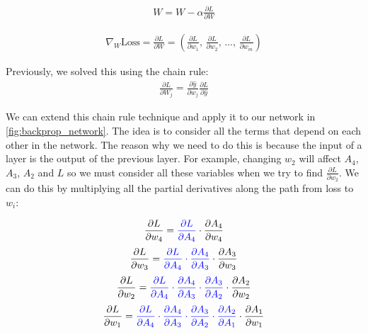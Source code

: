 \documentclass[11pt]{article}
\numberwithin{equation}{section}
\theoremstyle{definition}%
\newcommand{\Loss}{L}
\begin{document}
\begin{align}
    W = W - \alpha \frac{\partial \Loss}{\partial W}
\end{align}

\begin{align}
    \nabla_W \text{Loss} = \frac{\partial \Loss}{\partial W} = \left( \frac{\partial \Loss}{\partial w_1},\, \frac{\partial \Loss}{\partial w_2},\, \ldots,\, \frac{\partial \Loss}{\partial w_m} \right)
\end{align}

Previously, we solved this using the chain rule:
\begin{align}
    \frac{\partial L}{\partial W_j} = \frac{\partial \hat{y}}{\partial w_j} \frac{\partial L}{\partial \hat{y}}
\end{align}

We can extend this chain rule technique and apply it to our network in \autoref{fig:backprop_network}. The idea is to consider all the terms that depend on each other in the network. The reason why we need to do this is because the input of a layer is the output of the previous layer. For example, changing $w_2$ will affect $A_4$, $A_3$, $A_2$ and $L$ so we must consider all these variables when we try to find $\frac{\partial L}{\partial w_2}$. We can do this by multiplying all the partial derivatives along the path from loss to $w_i$:

\begin{align}
    \frac{\partial L}{\partial w_4} = \color{blue} \frac{\partial L}{\partial A_4} \color{black} \cdot \frac{\partial A_4}{\partial w_4}
\end{align}
\begin{align}
    \frac{\partial L}{\partial w_3} = \color{blue} \frac{\partial L}{\partial A_4} \cdot \frac{\partial A_4}{\partial A_3} \color{black} \cdot \frac{\partial A_3}{\partial w_3}
\end{align}
\begin{align}
    \frac{\partial L}{\partial w_2} = \color{blue} \frac{\partial L}{\partial A_4} \cdot \frac{\partial A_4}{\partial A_3} \cdot \frac{\partial A_3}{\partial A_2} \color{black} \cdot \frac{\partial A_2}{\partial w_2}
\end{align}
\begin{align}
    \frac{\partial L}{\partial w_1} = \color{blue} \frac{\partial L}{\partial A_4} \cdot \frac{\partial A_4}{\partial A_3} \cdot \frac{\partial A_3}{\partial A_2} \cdot \frac{\partial A_2}{\partial A_1} \color{black} \cdot \frac{\partial A_1}{\partial w_1}
\end{align}
\end{document}
